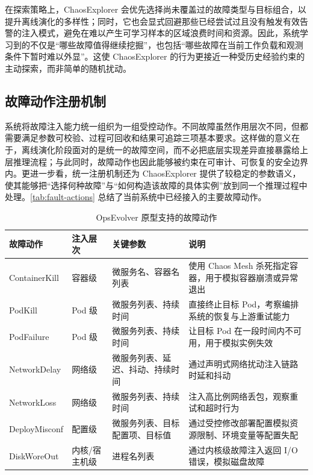 在探索策略上，ChaosExplorer 会优先选择尚未覆盖过的故障类型与目标组合，以提升离线演化的多样性；同时，它也会显式回避那些已经尝试过且没有触发有效告警的注入模式，避免在难以产生可学习样本的区域浪费时间和资源。因此，系统学习到的不仅是“哪些故障值得继续挖掘”，也包括“哪些故障在当前工作负载和观测条件下暂时难以外显”。这使 ChaosExplorer 的行为更接近一种受历史经验约束的主动探索，而非简单的随机扰动。

\subsection{故障动作注册机制}

系统将故障注入能力统一组织为一组受控动作。不同故障虽然作用层次不同，但都需要满足参数可校验、过程可回收和结果可追踪三项基本要求。这样做的意义在于，离线演化阶段面对的是统一的故障空间，而不必把底层实现差异直接暴露给上层推理流程；与此同时，故障动作也因此能够被约束在可审计、可恢复的安全边界内。更进一步看，统一注册机制还为 ChaosExplorer 提供了较稳定的参数语义，使其能够把“选择何种故障”与“如何构造该故障的具体实例”放到同一个推理过程中处理。\autoref{tab:fault-actions} 总结了当前系统中已经接入的主要故障动作。

\begin{table}[htbp]
    \centering
    \caption{OpsEvolver 原型支持的故障动作}
    \label{tab:fault-actions}
    \small
    \begin{tabular}{>{\centering\arraybackslash}m{2.3cm}>{\centering\arraybackslash}m{1.6cm}>{\centering\arraybackslash}m{3.1cm}>{\centering\arraybackslash}m{5.2cm}}
        \toprule
        故障动作 & 注入层次 & 关键参数 & 说明 \\
        \midrule
        ContainerKill & 容器级 & 微服务名、容器名列表 & 使用 Chaos Mesh 杀死指定容器，用于模拟容器崩溃或异常退出 \\
        PodKill & Pod 级 & 微服务列表、持续时间 & 直接终止目标 Pod，考察编排系统的恢复与上游重试能力 \\
        PodFailure & Pod 级 & 微服务列表、持续时间 & 让目标 Pod 在一段时间内不可用，用于模拟实例失效 \\
        NetworkDelay & 网络级 & 微服务列表、延迟、抖动、持续时间 & 通过声明式网络扰动注入链路时延和抖动 \\
        NetworkLoss & 网络级 & 微服务列表、持续时间 & 注入高比例网络丢包，观察重试和超时行为 \\
        DeployMisconf & 配置级 & 微服务列表、目标配置项、目标值 & 通过受控修改部署配置模拟资源限制、环境变量等配置失配 \\
        DiskWoreOut & 内核/宿主机级 & 进程名列表 & 通过内核级故障注入返回 I/O 错误，模拟磁盘故障 \\
        \bottomrule
    \end{tabular}
\end{table}

